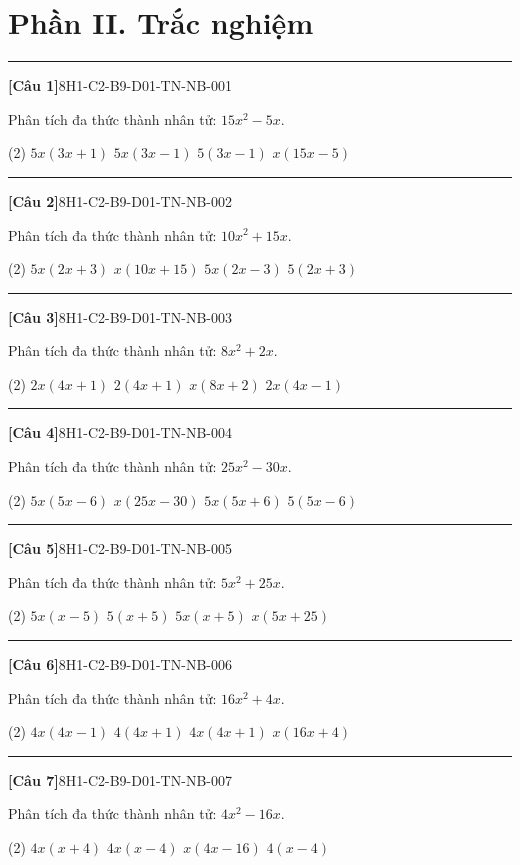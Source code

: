 \documentclass[12pt,a4paper]{article}
\newif\ifloigiai
\newenvironment{cauhoi}[2]{%
  \par\medskip\noindent\rule{\textwidth}{0.4pt}\par\nopagebreak
  \noindent\textbf{[#1]}\hfill{\scriptsize\ttfamily #2}\par\nopagebreak\smallskip}{\par}
\newcommand{\dapan}[1]{\ifloigiai\par\smallskip\noindent\textit{Đáp án:} \textbf{#1}\par\fi}
\begin{document}
\clearpage\section*{Phần II. Trắc nghiệm}
\begin{cauhoi}{Câu 1}{8H1-C2-B9-D01-TN-NB-001}
Phân tích đa thức thành nhân tử: $15x^{2} - 5x$.
\begin{tasks}(2)
\task $5x(3x + 1)$
\task $5x(3x - 1)$
\task $5(3x - 1)$
\task $x(15x - 5)$
\end{tasks}
\dapan{B}
\end{cauhoi}
\begin{cauhoi}{Câu 2}{8H1-C2-B9-D01-TN-NB-002}
Phân tích đa thức thành nhân tử: $10x^{2} + 15x$.
\begin{tasks}(2)
\task $5x(2x + 3)$
\task $x(10x + 15)$
\task $5x(2x - 3)$
\task $5(2x + 3)$
\end{tasks}
\dapan{A}
\end{cauhoi}
\begin{cauhoi}{Câu 3}{8H1-C2-B9-D01-TN-NB-003}
Phân tích đa thức thành nhân tử: $8x^{2} + 2x$.
\begin{tasks}(2)
\task $2x(4x + 1)$
\task $2(4x + 1)$
\task $x(8x + 2)$
\task $2x(4x - 1)$
\end{tasks}
\dapan{A}
\end{cauhoi}
\begin{cauhoi}{Câu 4}{8H1-C2-B9-D01-TN-NB-004}
Phân tích đa thức thành nhân tử: $25x^{2} - 30x$.
\begin{tasks}(2)
\task $5x(5x - 6)$
\task $x(25x - 30)$
\task $5x(5x + 6)$
\task $5(5x - 6)$
\end{tasks}
\dapan{A}
\end{cauhoi}
\begin{cauhoi}{Câu 5}{8H1-C2-B9-D01-TN-NB-005}
Phân tích đa thức thành nhân tử: $5x^{2} + 25x$.
\begin{tasks}(2)
\task $5x(x - 5)$
\task $5(x + 5)$
\task $5x(x + 5)$
\task $x(5x + 25)$
\end{tasks}
\dapan{C}
\end{cauhoi}
\begin{cauhoi}{Câu 6}{8H1-C2-B9-D01-TN-NB-006}
Phân tích đa thức thành nhân tử: $16x^{2} + 4x$.
\begin{tasks}(2)
\task $4x(4x - 1)$
\task $4(4x + 1)$
\task $4x(4x + 1)$
\task $x(16x + 4)$
\end{tasks}
\dapan{C}
\end{cauhoi}
\begin{cauhoi}{Câu 7}{8H1-C2-B9-D01-TN-NB-007}
Phân tích đa thức thành nhân tử: $4x^{2} - 16x$.
\begin{tasks}(2)
\task $4x(x + 4)$
\task $4x(x - 4)$
\task $x(4x - 16)$
\task $4(x - 4)$
\end{tasks}
\dapan{B}
\end{cauhoi}
\end{document}

